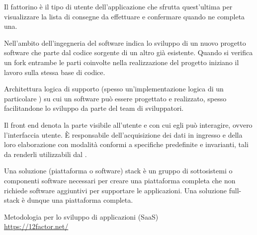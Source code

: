 Il fattorino è il tipo di utente dell’applicazione che sfrutta quest’ultima per visualizzare la lista di consegne da effettuare e confermare quando ne completa una.

Nell'ambito dell'ingegneria del software indica lo sviluppo di un nuovo progetto software che parte dal codice sorgente di un altro già esistente. Quando si verifica un fork entrambe le parti coinvolte nella realizzazione del progetto iniziano il lavoro sulla stessa base di codice.

Architettura logica di supporto (spesso un'implementazione logica di un particolare ) su cui un software può essere progettato e realizzato, spesso facilitandone lo sviluppo da parte del team di sviluppatori.

Il front end denota la parte visibile all’utente e con cui egli può interagire, ovvero l’interfaccia utente. \`{E} responsabile dell’acquisizione dei dati in ingresso e della loro elaborazione con modalità conformi a specifiche predefinite e invarianti, tali da renderli utilizzabili dal .

Una soluzione (piattaforma o software) stack è un gruppo di sottosistemi o componenti software necessari per creare una piattaforma completa che non richiede software aggiuntivi per supportare le applicazioni. Una soluzione full-stack è dunque una piattaforma completa.	

Metodologia per lo sviluppo di applicazioni  (SaaS)\\
\url{https://12factor.net/}
\clearpage
